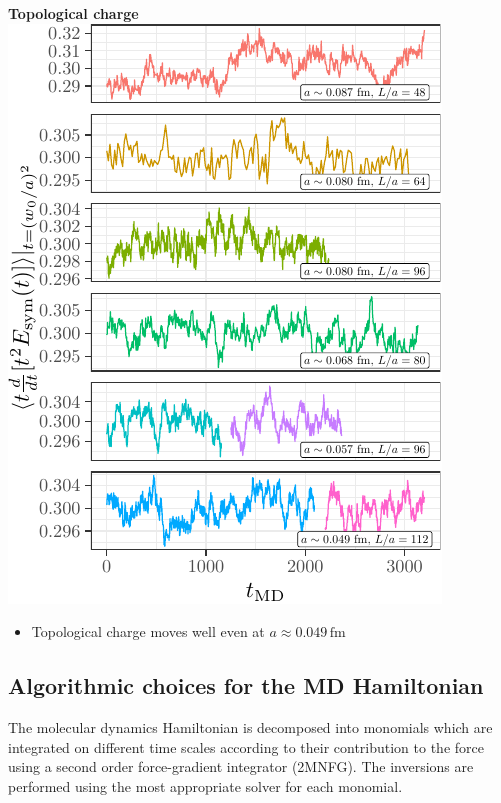 \documentclass[a0,portrait]{a0poster}
\begin{document}
\begin{multicols}{2}
\begin{minipage}{0.48\linewidth}
        \centering
        \textbf{\hspace{3cm}Topological charge}\\
        \includegraphics[width=\linewidth,page=2]{data/gf_observables/gf_observables_md_histories}
        \begin{itemize}
            \item Topological charge moves well even at $a\approx 0.049 \, \mathrm{fm}$
        \end{itemize}
    \end{minipage}

    \subsection*{Algorithmic choices for the MD Hamiltonian}
    \noindent The molecular dynamics Hamiltonian is decomposed into monomials which are integrated on different time scales according to their contribution to the force using a second order force-gradient integrator (2MNFG). The inversions are performed using the most appropriate solver for each monomial.
    \vspace{0.5cm}


\end{multicols}
\end{document}
